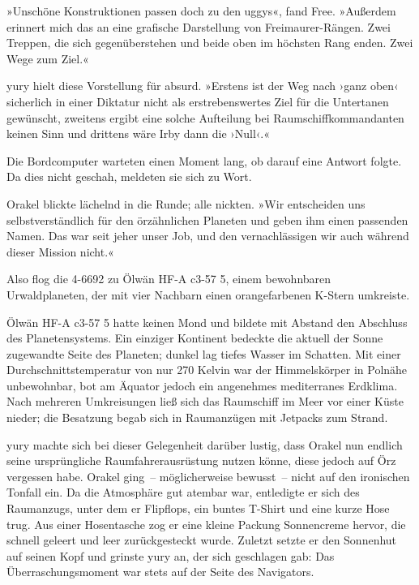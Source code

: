 »Unschöne Konstruktionen passen doch zu den uggys«, fand Free. »Außerdem erinnert mich das an eine grafische Darstellung von Freimaurer-Rängen. Zwei Treppen, die sich gegenüberstehen und beide oben im höchsten Rang enden. Zwei Wege zum Ziel.«

yury hielt diese Vorstellung für absurd. »Erstens ist der Weg nach ›ganz oben‹ sicherlich in einer Diktatur nicht als erstrebenswertes Ziel für die Untertanen gewünscht, zweitens ergibt eine solche Aufteilung bei Raumschiffkommandanten keinen Sinn und drittens wäre Irby dann die ›Null‹.«

Die Bordcomputer warteten einen Moment lang, ob darauf eine Antwort folgte. Da dies nicht geschah, meldeten sie sich zu Wort. 

Orakel blickte lächelnd in die Runde; alle nickten. »Wir entscheiden uns selbstverständlich für den örzähnlichen Planeten und geben ihm einen passenden Namen. Das war seit jeher unser Job, und den vernachlässigen wir auch während dieser Mission nicht.«

Also flog die 4-6692 zu Ölwän HF-A c3-57 5, einem bewohnbaren Urwaldplaneten, der mit vier Nachbarn einen orangefarbenen K-Stern umkreiste.

Ölwän HF-A c3-57 5 hatte keinen Mond und bildete mit Abstand den Abschluss des Planetensystems. Ein einziger Kontinent bedeckte die aktuell der Sonne zugewandte Seite des Planeten; dunkel lag tiefes Wasser im Schatten. Mit einer Durchschnittstemperatur von nur 270 Kelvin war der Himmelskörper in Polnähe unbewohnbar, bot am Äquator jedoch ein angenehmes mediterranes Erdklima. Nach mehreren Umkreisungen ließ sich das Raumschiff im Meer vor einer Küste nieder; die Besatzung begab sich in Raumanzügen mit Jetpacks zum Strand.

yury machte sich bei dieser Gelegenheit darüber lustig, dass Orakel nun endlich seine ursprüngliche Raumfahrerausrüstung nutzen könne, diese jedoch auf Örz vergessen habe. Orakel ging~– möglicherweise bewusst~– nicht auf den ironischen Tonfall ein. Da die Atmosphäre gut atembar war, entledigte er sich des Raumanzugs, unter dem er Flipflops, ein buntes T-Shirt und eine kurze Hose trug. Aus einer Hosentasche zog er eine kleine Packung Sonnencreme hervor, die schnell geleert und leer zurückgesteckt wurde. Zuletzt setzte er den Sonnenhut auf seinen Kopf und grinste yury an, der sich geschlagen gab: Das Überraschungsmoment war stets auf der Seite des Navigators.

